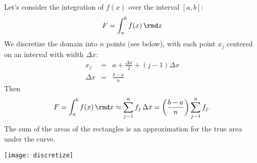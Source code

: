 \documentclass[11pt,titlepage,fleqn]{article}
\begin{document}
Let's consider the integration of $f(x)$ over the interval $[a,b]$:
%
\begin{equation}
F = \int_a^b f(x)\,\rmd x
\end{equation}
%
We discretize the domain into $n$ points (see below), with each point $x_j$ centered on an interval with width $\Delta x$:
%
\begin{eqnarray}
x_j &=& a + \frac{\Delta x}{2} + (j-1)\Delta x
\\
\Delta x &=& \frac{b-a}{n}
\end{eqnarray}
%
Then
%
\begin{equation}
F = \int_a^b f(x)\,\rmd x \approx \sum_{j-1}^n f_j\,\Delta x = \left( \frac{b-a}{n} \right) \sum_{j-1}^n f_j .
\end{equation}
%
The sum of the areas of the rectangles is an approximation for the true area under the curve.

\vspace{1cm}
\texttt{[image: discretize]}


\end{document}
